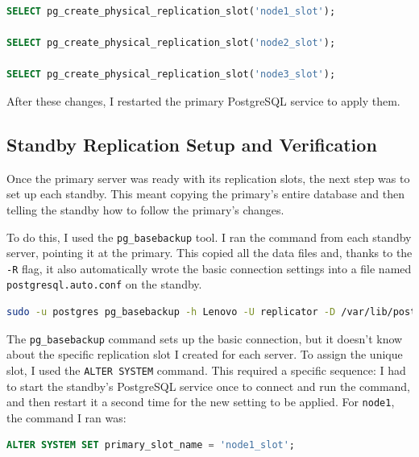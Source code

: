 \documentclass[conference]{IEEEtran}
\begin{document}
\begin{lstlisting}[language=sql, caption={Creating a dedicated replication slot for each standby on the Primary.}, label={lst:create_slots}]
SELECT pg_create_physical_replication_slot('node1_slot');

SELECT pg_create_physical_replication_slot('node2_slot');

SELECT pg_create_physical_replication_slot('node3_slot');

\end{lstlisting}

After these changes, I restarted the primary PostgreSQL service to apply them. 

\subsection{Standby Replication Setup and Verification}

Once the primary server was ready with its replication slots, the next step was to set up each standby. This meant copying the primary's entire database and then telling the standby how to follow the primary's changes.

To do this, I used the \texttt{pg\_basebackup} tool. I ran the command from each standby server, pointing it at the primary. This copied all the data files and, thanks to the \texttt{-R} flag, it also automatically wrote the basic connection settings into a file named \texttt{postgresql.auto.conf} on the standby.
\begin{lstlisting}[language=bash, caption={Cloning the primary database to a standby.}]
sudo -u postgres pg_basebackup -h Lenovo -U replicator -D /var/lib/postgresql/17/main -P -R -Xs
\end{lstlisting}

The \texttt{pg\_basebackup} command sets up the basic connection, but it doesn't know about the specific replication slot I created for each server. To assign the unique slot, I used the \texttt{ALTER SYSTEM} command. This required a specific sequence: I had to start the standby's PostgreSQL service once to connect and run the command, and then restart it a second time for the new setting to be applied. For \texttt{node1}, the command I ran was:
\begin{lstlisting}[language=sql, caption={Assigning the unique slot using ALTER SYSTEM on standby node1.}, label={lst:alter_system}]
ALTER SYSTEM SET primary_slot_name = 'node1_slot';
\end{lstlisting}
\end{document}
